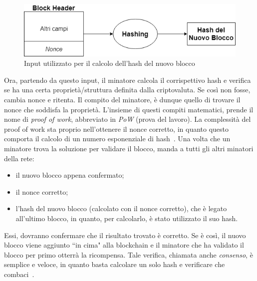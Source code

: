 \begin{figure}
\centering 
\includegraphics[scale=0.55]{immagini/cap2/3-input} 
\caption{Input utilizzato per il calcolo dell'hash del nuovo blocco}
\label{im:input} 
\end{figure}
Ora, partendo da questo input, il minatore calcola il corrispettivo hash e verifica se ha una certa proprietà/struttura definita dalla criptovaluta. Se così non fosse, cambia nonce e ritenta. Il compito del minatore, \`e dunque quello di trovare il nonce che soddisfa la proprietà. L'insieme di questi compiti matematici, prende il nome di \textit{proof of work}, abbreviato in \textit{PoW} (prova del lavoro).
La complessità del proof of work sta proprio nell'ottenere il nonce corretto, in quanto questo comporta il calcolo di un numero esponenziale di hash~\cite{art:bc2}.
Una volta che un minatore trova la soluzione per validare il blocco, manda a tutti gli altri minatori della rete:
\begin{itemize}
\item il nuovo blocco appena confermato;
\item il nonce corretto;
\item l'hash del nuovo blocco (calcolato con il nonce corretto), che \`e legato all'ultimo blocco, in quanto, per calcolarlo, \`e stato utilizzato il suo hash.
\end{itemize}
Essi, dovranno confermare che il risultato trovato \`e corretto. Se \`e così, il nuovo blocco viene aggiunto ``in cima" alla blockchain e il minatore che ha validato il blocco per primo otterrà la ricompensa. Tale verifica, chiamata anche \textit{consenso}, \`e semplice e veloce, in quanto basta calcolare un solo hash e verificare che combaci~\cite{art:bc2}.

